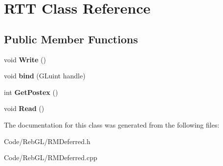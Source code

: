 \hypertarget{class_r_t_t}{}\section{R\+TT Class Reference}
\label{class_r_t_t}
\subsection*{Public Member Functions}
\begin{DoxyCompactItemize}
\item 
void {\bfseries Write} ()\hypertarget{class_r_t_t_af5d5500597103c8ed661a0635b81ef8c}{}\label{class_r_t_t_af5d5500597103c8ed661a0635b81ef8c}

\item 
void {\bfseries bind} (G\+Luint handle)\hypertarget{class_r_t_t_a12eaad78d5316cb11fe87a764ed0d5f1}{}\label{class_r_t_t_a12eaad78d5316cb11fe87a764ed0d5f1}

\item 
int {\bfseries Get\+Postex} ()\hypertarget{class_r_t_t_ab460766afd2bb9c1cb370a8d08d3ea7f}{}\label{class_r_t_t_ab460766afd2bb9c1cb370a8d08d3ea7f}

\item 
void {\bfseries Read} ()\hypertarget{class_r_t_t_ae7d04e5b286b9f42c8d8907f673c30d0}{}\label{class_r_t_t_ae7d04e5b286b9f42c8d8907f673c30d0}

\end{DoxyCompactItemize}


The documentation for this class was generated from the following files\+:\begin{DoxyCompactItemize}
\item 
Code/\+Reb\+G\+L/R\+M\+Deferred.\+h\item 
Code/\+Reb\+G\+L/R\+M\+Deferred.\+cpp\end{DoxyCompactItemize}
